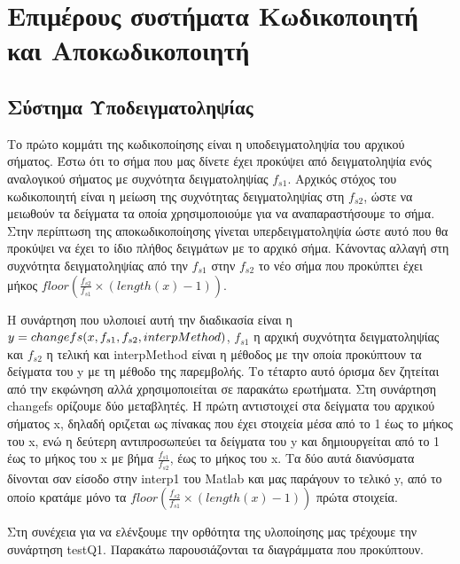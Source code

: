 \chapter{Επιμέρους συστήματα Κωδικοποιητή και Αποκωδικοποιητή}

\section{Σύστημα Υποδειγματοληψίας}

\par Το πρώτο κομμάτι της κωδικοποίησης είναι η υποδειγματοληψία του αρχικού σήματος. 
Έστω ότι το σήμα που μας δίνετε έχει προκύψει από δειγματοληψία ενός αναλογικού 
σήματος με συχνότητα δειγματοληψίας $f_{s1}$. Αρχικός στόχος του κωδικοποιητή 
είναι η μείωση της συχνότητας δειγματοληψίας στη $f_{s2}$, ώστε να μειωθούν τα δείγματα τα 
οποία χρησιμοποιούμε για να αναπαραστήσουμε το σήμα. Στην περίπτωση της αποκωδικοποίησης 
γίνεται υπερδειγματοληψία ώστε αυτό που θα προκύψει να έχει το ίδιο πλήθος δειγμάτων 
με το αρχικό σήμα. Κάνοντας αλλαγή στη συχνότητα δειγματοληψίας από την $f_{s1}$ στην 
$f_{s2}$ το νέο σήμα που προκύπτει έχει μήκος $floor(\frac{f_{s2}}{f_{s1}}\times
(length(x)-1))$.

\par Η συνάρτηση που υλοποιεί αυτή την διαδικασία είναι η $y=changefs(x,f_{s1},\\f_{s2},
interpMethod)$, $f_{s1}$ η αρχική συχνότητα δειγματοληψίας και $f_{s2}$ η τελική και interpMethod είναι η μέθοδος 
με την οποία προκύπτουν τα δείγματα του y με τη μέθοδο της παρεμβολής. Το τέταρτο αυτό 
όρισμα δεν ζητείται από την εκφώνηση αλλά χρησιμοποιείται σε παρακάτω ερωτήματα. 
Στη συνάρτηση changefs ορίζουμε δύο μεταβλητές. Η πρώτη αντιστοιχεί στα δείγματα του αρχικού σήματος 
x, δηλαδή οριζεται ως πίνακας που έχει στοιχεία μέσα από το 1 έως το μήκος του x, 
ενώ η δεύτερη αντιπροσωπεύει τα δείγματα του y και δημιουργείται από το 1 έως το μήκος 
του x με βήμα $\frac{f_{s1}}{f_{s2}}$, έως το μήκος του x. Τα δύο αυτά διανύσματα 
δίνονται σαν είσοδο στην interp1 του Matlab και μας παράγουν το τελικό y, από το οποίο 
κρατάμε μόνο τα $floor(\frac{f_{s2}}{f_{s1}}\times(length(x)-1))$ πρώτα στοιχεία.

\par Στη συνέχεια για να ελένξουμε την ορθότητα της υλοποίησης μας τρέχουμε την 
συνάρτηση testQ1. Παρακάτω παρουσιάζονται τα διαγράμματα που προκύπτουν.

